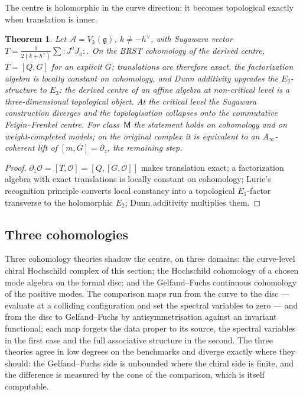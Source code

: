 \documentclass[11pt]{amsart}
\numberwithin{equation}{section}
\theoremstyle{plain}
\newtheorem{theorem}{Theorem}[section]
\theoremstyle{definition}
\theoremstyle{remark}
\newcommand{\cA}{\mathcal{A}}
\newcommand{\fg}{\mathfrak{g}}
\newcommand{\dvee}{h^{\vee}}
\begin{document}
The centre is holomorphic in the curve direction; it becomes topological
exactly when translation is inner.

\begin{theorem}\label{thm:E3}
Let $\cA=V_k(\fg)$, $k\neq-\dvee$, with Sugawara vector
$T=\tfrac{1}{2(k+\dvee)}\sum:\!J^{a}J_{a}\!:$. On the BRST cohomology of
the derived centre, $T=[Q,G]$ for an explicit $G$; translations are
therefore exact, the factorization algebra is locally constant on
cohomology, and Dunn additivity upgrades the $E_2$-structure to
$E_3$: the derived centre of an affine algebra at non-critical level is
a three-dimensional topological object. At the critical level the
Sugawara construction diverges and the topologisation collapses onto the
commutative Feigin--Frenkel centre. For class~$\mathsf{M}$ the
statement holds on cohomology and on weight-completed models; on the
original complex it is equivalent to an $A_\infty$-coherent lift of
$[m,G]=\partial_z$, the remaining step.
\end{theorem}

\begin{proof}
$\partial_z\mathcal{O}=[T,\mathcal{O}]=[Q,[G,\mathcal{O}]]$ makes
translation exact; a factorization algebra with exact translations is
locally constant on cohomology; Lurie's recognition principle converts
local constancy into a topological $E_1$-factor transverse to the
holomorphic $E_2$; Dunn additivity multiplies them.
\end{proof}

\subsection{Three cohomologies}

Three cohomology theories shadow the centre, on three domains: the
curve-level chiral Hochschild complex of this section; the Hochschild
cohomology of a chosen mode algebra on the formal disc; and the
Gelfand--Fuchs continuous cohomology of the positive modes. The
comparison maps run from the curve to the disc --- evaluate at a
colliding configuration and set the spectral variables to zero ---
and from the disc to Gelfand--Fuchs by antisymmetrisation against an
invariant functional; each map forgets the data proper to its source,
the spectral variables in the first case and the full associative
structure in the second. The three theories agree in low degrees on
the benchmarks and diverge exactly where they should: the
Gelfand--Fuchs side is unbounded where the chiral side is finite, and
the difference is measured by the cone of the comparison, which is
itself computable.
\end{document}
